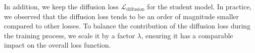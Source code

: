 
In addition, we keep the diffusion loss $\mathcal{L}_{\text{diffusion}}$ for the student model. In practice, we observed that the diffusion loss tends to be an order of magnitude smaller compared to other losses. To balance the contribution of the diffusion loss during the training process, we scale it by a factor \( \lambda \), ensuring it has a comparable impact on the overall loss function.






